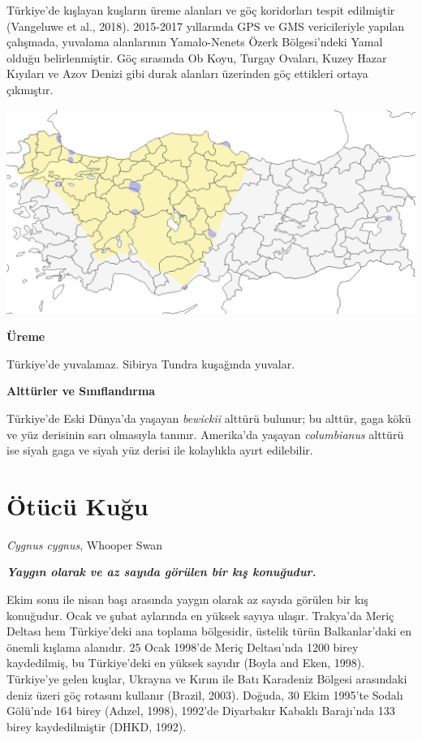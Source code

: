 \documentclass[
  a4paper,
  DIV=11,
  numbers=noendperiod]{scrartcl}
\begin{document}
Türkiye'de kışlayan kuşların üreme alanları ve göç koridorları tespit
edilmiştir (Vangeluwe et al., 2018). 2015-2017 yıllarında GPS ve GMS
vericileriyle yapılan çalışmada, yuvalama alanlarının Yamalo-Nenets
Özerk Bölgesi'ndeki Yamal olduğu belirlenmiştir. Göç sırasında Ob Koyu,
Turgay Ovaları, Kuzey Hazar Kıyıları ve Azov Denizi gibi durak alanları
üzerinden göç ettikleri ortaya çıkmıştır.

\includegraphics{images/harita_Cygnus columbianus.png}

\textbf{Üreme}

Türkiye'de yuvalamaz. Sibirya Tundra kuşağında yuvalar.

\textbf{Alttürler ve Sınıflandırma}

Türkiye'de Eski Dünya'da yaşayan \emph{bewickii} alttürü bulunur; bu
alttür, gaga kökü ve yüz derisinin sarı olmasıyla tanınır. Amerika'da
yaşayan \emph{columbianus} alttürü ise siyah gaga ve siyah yüz derisi
ile kolaylıkla ayırt edilebilir.

\section{Ötücü Kuğu}\label{uxf6tuxfccuxfc-kuux11fu}

\emph{Cygnus cygnus}, Whooper Swan

\textbf{\emph{Yaygın olarak ve az sayıda görülen bir kış konuğudur.}}

Ekim sonu ile nisan başı arasında yaygın olarak az sayıda görülen bir
kış konuğudur. Ocak ve şubat aylarında en yüksek sayıya ulaşır.
Trakya'da Meriç Deltası hem Türkiye'deki ana toplama bölgesidir, üstelik
türün Balkanlar'daki en önemli kışlama alanıdır. 25 Ocak 1998'de Meriç
Deltası'nda 1200 birey kaydedilmiş, bu Türkiye'deki en yüksek sayıdır
(Boyla and Eken, 1998). Türkiye'ye gelen kuşlar, Ukrayna ve Kırım ile
Batı Karadeniz Bölgesi arasındaki deniz üzeri göç rotasını kullanır
(Brazil, 2003). Doğuda, 30 Ekim 1995'te Sodalı Gölü'nde 164 birey
(Adızel, 1998), 1992'de Diyarbakır Kabaklı Barajı'nda 133 birey
kaydedilmiştir (DHKD, 1992).
\end{document}
